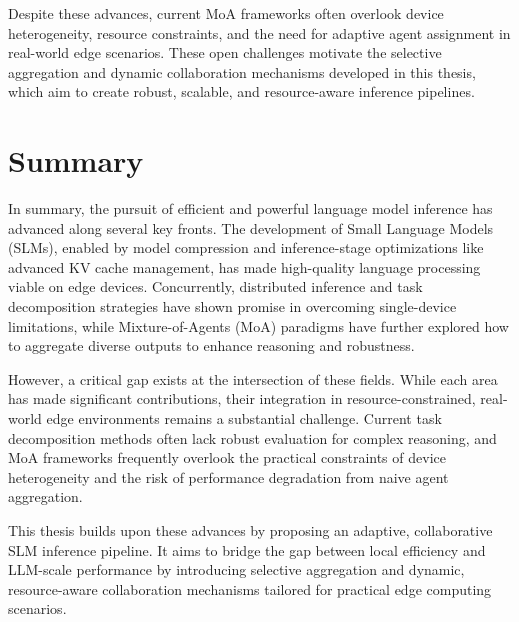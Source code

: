 Despite these advances, current MoA frameworks often overlook device heterogeneity, resource constraints, and the need for adaptive agent assignment in real-world edge scenarios. These open challenges motivate the selective aggregation and dynamic collaboration mechanisms developed in this thesis, which aim to create robust, scalable, and resource-aware inference pipelines.

\section{Summary}
In summary, the pursuit of efficient and powerful language model inference has advanced along several key fronts. The development of Small Language Models (SLMs), enabled by model compression and inference-stage optimizations like advanced KV cache management, has made high-quality language processing viable on edge devices. Concurrently, distributed inference and task decomposition strategies have shown promise in overcoming single-device limitations, while Mixture-of-Agents (MoA) paradigms have further explored how to aggregate diverse outputs to enhance reasoning and robustness.

However, a critical gap exists at the intersection of these fields. While each area has made significant contributions, their integration in resource-constrained, real-world edge environments remains a substantial challenge. Current task decomposition methods often lack robust evaluation for complex reasoning, and MoA frameworks frequently overlook the practical constraints of device heterogeneity and the risk of performance degradation from naive agent aggregation.

This thesis builds upon these advances by proposing an adaptive, collaborative SLM inference pipeline. It aims to bridge the gap between local efficiency and LLM-scale performance by introducing selective aggregation and dynamic, resource-aware collaboration mechanisms tailored for practical edge computing scenarios. 